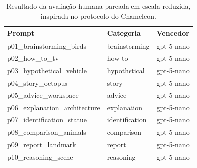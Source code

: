 \begin{table}[htbp]
\centering
\begin{tabular}{lll}
\hline
Prompt & Categoria & Vencedor \\
\hline
p01\_brainstorming\_birds & brainstorming & gpt-5-nano \\
p02\_how\_to\_tv & how-to & gpt-5-nano \\
p03\_hypothetical\_vehicle & hypothetical & gpt-5-nano \\
p04\_story\_octopus & story & gpt-5-nano \\
p05\_advice\_workspace & advice & gpt-5-nano \\
p06\_explanation\_architecture & explanation & gpt-5-nano \\
p07\_identification\_statue & identification & gpt-5-nano \\
p08\_comparison\_animals & comparison & gpt-5-nano \\
p09\_report\_landmark & report & gpt-5-nano \\
p10\_reasoning\_scene & reasoning & gpt-5-nano \\
\hline
\end{tabular}
\caption{Resultado da avaliação humana pareada em escala reduzida, inspirada no protocolo do Chameleon.}
\label{tab:chameleon-mini-eval}
\end{table}
